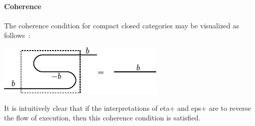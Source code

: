 \documentclass[preprint]{sigplanconf}
\begin{document}


\paragraph*{Coherence}
The coherence condition for compact closed categories may be visualized as
follows~\cite{springerlink:10.1007/978-3-642-12821-94}:
\begin{center}
  \includegraphics{diagrams/coherence.pdf}
\end{center}
It is intuitively clear that if the interpretations of {{eta+}} and {{eps+}}
are to reverse the flow of execution, then this coherence condition is
satisfied.
\end{document}
